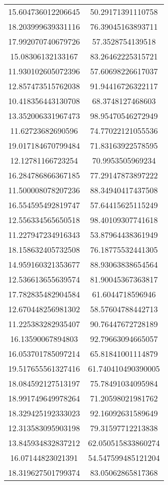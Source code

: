 \begin{table}
\begin{tabular}{cc}
15.604736012206645 & 50.29171391110758 \\
18.203999639331116 & 76.39045163893711 \\
17.992070740679726 & 57.3528754139518 \\
15.08306132133167 & 83.26462225315721 \\
11.930102605072396 & 57.60698226617037 \\
12.857473515762038 & 91.94416726322117 \\
10.418356443130708 & 68.3748127468603 \\
13.352006331967473 & 98.95470546272949 \\
11.62723682690596 & 74.77022121055536 \\
19.017184670799484 & 71.83163922578595 \\
12.12781166723254 & 70.9953505969234 \\
16.284786866367185 & 77.29147873897222 \\
11.500008078207236 & 88.34940417437508 \\
16.554595492819747 & 57.64415625115249 \\
12.556334565650518 & 98.40109307741618 \\
11.227947234916343 & 53.87964438361949 \\
18.158632405732508 & 76.18775532441305 \\
14.959160321353677 & 88.93063838654564 \\
12.536613655639574 & 81.90045367363817 \\
17.782835482904584 & 61.6044718596946 \\
12.670448256981302 & 58.57604788442713 \\
11.225383282935407 & 90.76447672728189 \\
16.13590067894803 & 92.79663094665057 \\
16.053701785097214 & 65.81841001114879 \\
19.517655561327416 & 61.740410490390005 \\
18.084592127513197 & 75.78491034095984 \\
18.991749649978264 & 71.20598021981762 \\
18.329425192333023 & 92.16092631589649 \\
12.313583095903198 & 79.31597712213838 \\
13.845934832837212 & 62.050515833860274 \\
16.07144823021391 & 54.547599485121204 \\
18.319627501799374 & 83.05062865817368 \\

\end{tabular}
\end{table}
